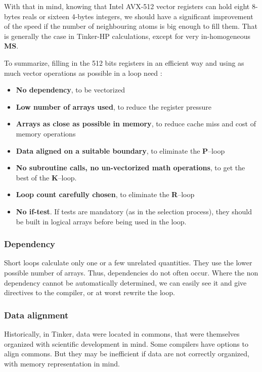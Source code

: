 \documentclass[9pt,comparison]{livecoms}
\begin{document}
\begin{enumerate}
\end{enumerate}

With that in mind, knowing that Intel AVX-512 vector registers can hold eight 8-bytes reals or sixteen 4-bytes integers, we should have a significant improvement of the speed if the number of neighbouring atoms is big enough to fill them. That is generally the case in Tinker-HP calculations, except for very in-homogeneous \textbf{MS}.

To summarize, filling in the 512 bits registers in an efficient way and using as much vector operations as possible in a loop need :
\begin{itemize}
    \item \textbf{No dependency}, to be vectorized
    \item \textbf{Low number of arrays used}, to reduce the register pressure
    \item \textbf{Arrays as close as possible in memory}, to reduce cache miss and cost of memory operations
    \item \textbf{Data aligned on a suitable boundary}, to eliminate the \textbf{P}--loop
    \item \textbf{No subroutine calls, no un-vectorized math operations}, to get the best of the \textbf{K}--loop.
    \item \textbf{Loop count carefully chosen}, to eliminate the \textbf{R}--loop
    \item \textbf{No if-test}. If tests are mandatory (as in the selection process), they should be built in logical arrays before being used in the loop.
\end{itemize}
\subsubsection{Dependency}
\hspace{\parindent}Short loops calculate only one or a few unrelated quantities. They use the lower possible number of arrays. Thus, dependencies do not often occur. Where the non dependency cannot be automatically determined, we can easily see it and give directives to the compiler, or at worst rewrite the loop. 

\subsubsection{Data alignment}
\hspace{\parindent}Historically, in Tinker, data were located in commons, that were themselves organized with scientific development in mind. Some compilers have options to align commons. But they may be inefficient if data are not correctly organized, with memory representation in mind.
\end{document}

